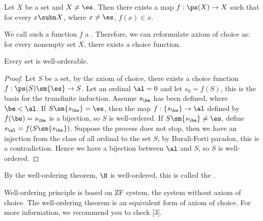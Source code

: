 \documentclass[10pt]{article}
\begin{document}
\begin{Axiom of choice}
    Let $X$ be a set and $X\ne\es$. Then there exists a map $f:\ps(X)\to X$ such that for every $x\subn X$, where $x\ne\es$, $f(x)\in x$. 
\end{Axiom of choice}
\par
We call such a function $f$ a . Therefore, we can reformulate axiom of choice as: for every nonempty set $X$, there exists a choice function.
\begin{theorem}
    Every set is well-orderable.
\end{theorem}
\begin{proof}
    Let $S$ be a set, by the axiom of choice, there exists a choice function $f:\ps(S)\sm\{\es\}\to S$. Let an ordinal $\al=0$ and let ${s}_{0}=f(S)$, this is the basis for the transfinite induction. Assume ${s}_{\be}$ has been defined, where $\be<\al$. If $S\sm\{{s}_{\be}\}=\es$, then the map $f:\{{s}_{\be}\}\to\al$ defined by $f(\be)={s}_{\be}$ is a bijection, so $S$ is well-ordered. If $S\sm\{{s}_{\be}\}\ne\es$, define ${s}_{\al}=f(S\sm\{{s}_{\be}\})$. Suppose the process does not stop, then we have an injection from the class of all ordinal to the set $S$, by Burali-Forti paradox, this is a contradiction. Hence we have a bijection between $\al$ and $S$, so $S$ is well-ordered.
\end{proof}
\par
By the well-ordering theorem, $\N$ is well-ordered, this is called the .
\begin{remark}
    Well-ordering principle is based on ZF system, the system without axiom of choice. The well-ordering theorem is an equivalent form of axiom of choice. For more information, we recommend you to check [3].
\end{remark}
\end{document}
